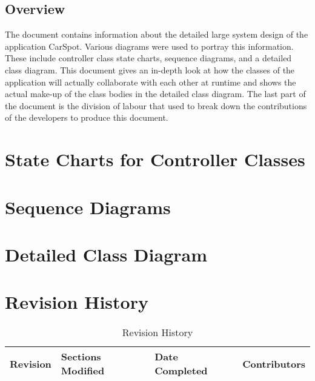 \documentclass[12pt]{article}
\begin{document}
\subsection{Overview}
\label{sub:overview}
The document contains information about the detailed large system design of the application CarSpot. Various diagrams were used to portray this information. These include controller class state charts, sequence diagrams, and a detailed class diagram. This document gives an in-depth look at how the classes of the application will actually collaborate with each other at runtime and shows the actual make-up of the class bodies in the detailed class diagram. The last part of the document is the division of labour that used to break down the contributions of the developers to produce this document.


\section{State Charts for Controller Classes}

\section{Sequence Diagrams}

\section{Detailed Class Diagram}

\newpage

\FloatBarrier
\appendix
\section{Revision History}
\begin{table}[ht]
	\centering
	\begin{tabular}{|p{2cm}|p{5cm}|p{3cm}|p{3cm}|}
		\hline
		\textbf{Revision} & \textbf{Sections Modified} & \textbf{Date Completed} & \textbf{Contributors}\\
		\hline
	\end{tabular}
	\caption{Revision History}
	\label{table:1}
\end{table}
\end{document}
